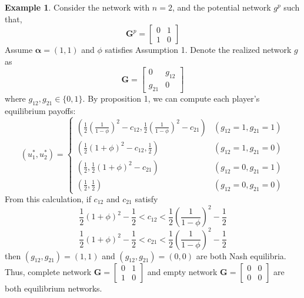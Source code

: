 \documentclass[12pt]{article}
\theoremstyle{definition}
\newtheorem{example}{Example}
\begin{document}
\begin{example}
Consider the network with $n=2$, and the potential network $g^p$ such that,
\[ \bm{G}^p = \left[
	\begin{array}{cc}
		0 & 1 \\
		1 & 0
	\end{array} \right] \]
Assume $\bm{\alpha} = (1, 1)$ and $\phi$ satisfies Assumption 1.
Denote the realized network $g$ as
\[ \bm{G} = \left[
	\begin{array}{cc}
		0 & g_{12} \\
		g_{21} & 0
	\end{array} \right] \]
where $g_{12}, g_{21} \in \{0,1\}$.
By proposition 1, we can compute each player's equilibrium payoffs:
\[ (u_1^*, u_2^*) =
	\begin{cases}
		\left( \frac{1}{2}{\left( \frac{1}{1 - \phi} \right)}^2 - c_{12}, \frac{1}{2}{\left( \frac{1}{1 - \phi} \right)}^2 - c_{21} \right) & (g_{12} = 1, g_{21} = 1) \\
		\left( \frac{1}{2}{(1+\phi)}^2 - c_{12}, \frac{1}{2} \right) & (g_{12} = 1, g_{21} = 0) \\
		\left( \frac{1}{2}, \frac{1}{2}{(1+\phi)}^2 - c_{21} \right) & (g_{12} = 0, g_{21} = 1) \\
		\left( \frac{1}{2}, \frac{1}{2} \right) & (g_{12} = 0, g_{21} = 0)
	\end{cases} \]
From this calculation, if $c_{12}$ and $c_{21}$ satisfy
\[ \frac{1}{2}{(1+\phi)}^2 - \frac{1}{2} < c_{12} < \frac{1}{2}{\left( \frac{1}{1 - \phi} \right)}^2 - \frac{1}{2} \]
\[ \frac{1}{2}{(1+\phi)}^2 - \frac{1}{2} < c_{21} < \frac{1}{2}{\left( \frac{1}{1 - \phi} \right)}^2 - \frac{1}{2} \]
then $(g_{12}, g_{21}) = (1,1)$ and $(g_{12}, g_{21}) = (0,0)$ are both Nash equilibria.
Thus, complete network $\bm{G} = \left[
	\begin{array}{cc}
		0 & 1 \\
		1 & 0
	\end{array} \right]$
and empty network $\bm{G} = \left[
	\begin{array}{cc}
		0 & 0 \\
		0 & 0
	\end{array} \right]$
are both equilibrium networks.
\end{example}
\end{document}
